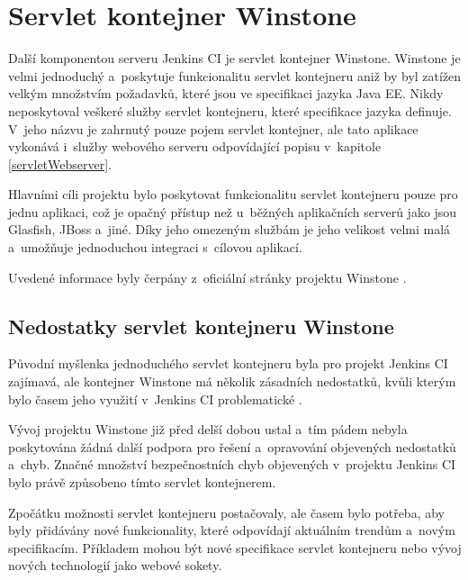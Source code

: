     \section{Servlet kontejner Winstone} \label{winstone}
        Další komponentou serveru Jenkins CI je servlet kontejner Winstone.
        Winstone je velmi jednoduchý a~poskytuje funkcionalitu
        servlet kontejneru aniž by byl zatížen velkým množstvím požadavků, které jsou ve specifikaci jazyka Java EE.
        Nikdy neposkytoval veškeré služby servlet kontejneru, které specifikace jazyka definuje. 
        V~jeho názvu je zahrnutý pouze pojem servlet kontejner, ale tato aplikace vykonává i~služby
        webového serveru odpovídající popisu v~kapitole \ref{servletWebserver}.

        Hlavními cíli projektu bylo poskytovat funkcionalitu servlet kontejneru pouze pro jednu aplikaci,
        což je opačný přístup než u~běžných aplikačních serverů jako jsou Glasfish, JBoss a~jiné.
        Díky jeho omezeným službám je jeho velikost velmi malá a~umožňuje jednoduchou integraci
        s~cílovou aplikací.

        Uvedené informace byly čerpány z~oficiální stránky projektu Winstone \cite{winstoneWeb}.

        \subsection{Nedostatky servlet kontejneru Winstone}
            Původní myšlenka jednoduchého servlet kontejneru byla pro projekt Jenkins CI zajímavá, ale
            kontejner Winstone má několik zásadních nedostatků, kvůli kterým bylo časem jeho využití
            v~Jenkins CI problematické \cite{kohsukeTopic}. 

            Vývoj projektu Winstone již před delší dobou ustal a~tím pádem nebyla poskytována 
            žádná další podpora pro řešení a~opravování objevených nedostatků a~chyb. 
            Značné množství bezpečnostních chyb objevených v~projektu Jenkins CI bylo právě
            způsobeno tímto servlet kontejnerem.

            Zpočátku možnosti servlet kontejneru postačovaly, ale časem bylo potřeba, aby 
            byly přidávány nové funkcionality, které odpovídají aktuálním trendům
            a~novým specifikacím. Příkladem mohou být nové specifikace servlet kontejneru nebo
            vývoj nových technologií jako webové sokety.


